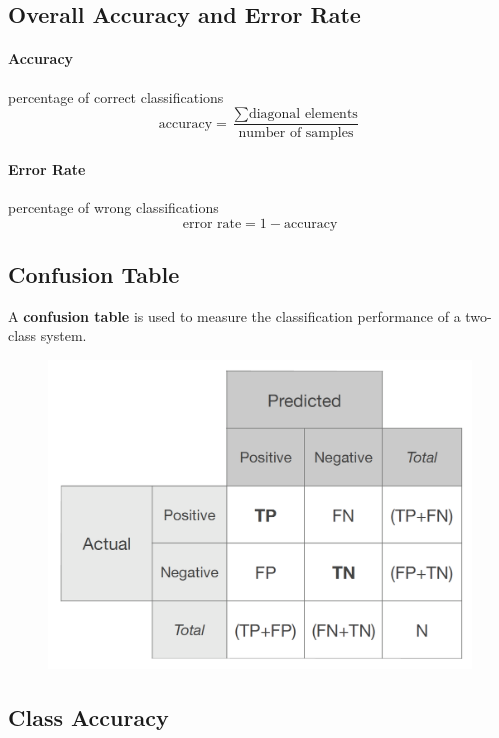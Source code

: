 \documentclass[11pt]{article}
\begin{document}
\subsection{Overall Accuracy and Error Rate}

\paragraph{Accuracy} percentage of correct classifications
\begin{equation*}
	\text{accuracy} = \frac{\sum\text{diagonal elements}}{\text{number of samples}}
\end{equation*}

\paragraph{Error Rate} percentage of wrong classifications
\begin{equation*}
	\text{error rate} = 1 - \text{accuracy}
\end{equation*}

\subsection{Confusion Table}

A \textbf{confusion table} is used to measure the classification performance of a two-class system.

\begin{figure}[H]
	\centering
	\includegraphics[width=0.4\linewidth]{img/confusion_table}
\end{figure}

\subsection{Class Accuracy}
\end{document}
